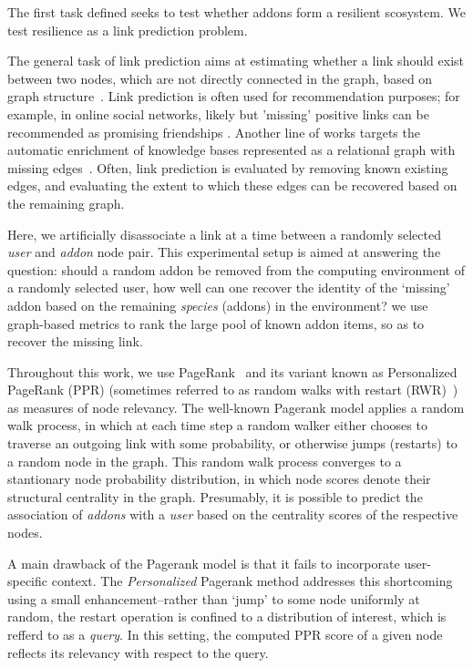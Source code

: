 \documentclass[ijoc,nonblindrev]{informs3} %
\numberwithin{equation}{subsection}
\begin{document}
The first task defined seeks to test whether addons form a resilient scosystem. We test resilience as a link prediction problem. 

The general task of link prediction aims at estimating whether a link should exist between two nodes, which are not directly connected in the graph, based on graph structure~\citep{henzinger2000link,getoor2005link,lu2011link,sunWSDM12}. Link prediction is often used for recommendation purposes; for example, in online social networks, likely but 'missing' positive links can be recommended as promising friendships \citep{leskovec2010predicting}. Another line of works targets the automatic enrichment of knowledge bases represented as a relational graph with missing edges~\citep{lao2010relational}. Often, link prediction is evaluated by removing known existing edges, and evaluating the extent to which these edges can be recovered based on the remaining graph.

Here, we artificially disassociate a link at a time between a randomly selected {\it user} and {\it addon} node pair. This experimental setup is aimed at answering the question: should a random addon be removed from the computing environment of a randomly selected user, how well can one recover the identity of the `missing' addon based on the remaining {\it species} (addons) in the environment? we use graph-based metrics to rank the large pool of known addon items, so as to recover the missing link. 

Throughout this work, we use PageRank~\citep{page1999pagerank,franceschet2011pagerank} and its variant known as Personalized PageRank (PPR) (sometimes referred to as random walks with restart (RWR)~\citep{tongKAIS08}) as measures of node relevancy. The well-known Pagerank model applies a random walk process, in which at each time step a random walker either chooses to traverse an outgoing link with some probability, or otherwise jumps (restarts) to a random node in the graph. This random walk process converges to a stantionary node probability distribution, in which node scores denote their structural centrality in the graph. Presumably, it is possible to predict the association of {\it addons} with a {\it user} based on the centrality scores of the respective nodes.

A main drawback of the Pagerank model is that it fails to incorporate user-specific context. The {\it Personalized} Pagerank method addresses this shortcoming using a small enhancement--rather than `jump' to some node uniformly at random, the restart operation is confined to a distribution of interest, which is refferd to as a {\it query}. In this setting, the computed PPR score of a given node reflects its relevancy with respect to the query.
\end{document}
